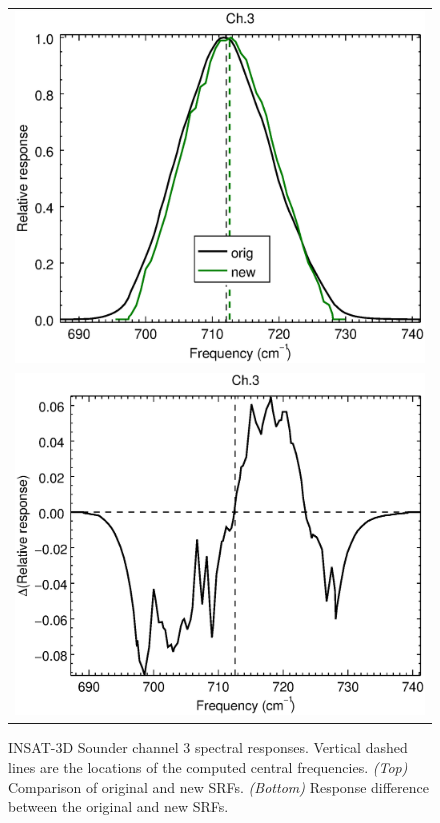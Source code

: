 \begin{figure}[H]
  \centering
  \begin{tabular}{c}
    \includegraphics[scale=0.55]{graphics/sndr/srf/sndr_insat3d-3.eps} \\
    \includegraphics[scale=0.55]{graphics/sndr/srf/sndr_insat3d-3.difference.eps}
  \end{tabular}
  \caption{INSAT-3D Sounder channel 3 spectral responses. Vertical dashed lines are the locations of the computed central frequencies. \emph{(Top)} Comparison of original and new SRFs. \emph{(Bottom)} Response difference between the original and new SRFs.}
  \label{fig:sndr_ch3}
\end{figure}


